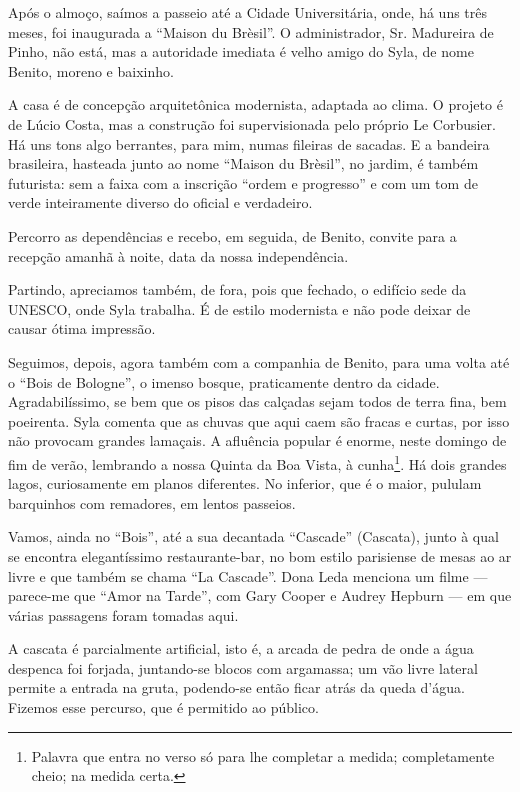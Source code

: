 Após o almoço, saímos a passeio até a Cidade Universitária, onde, há uns três meses, foi inaugurada a ``Maison du Brèsil''. O administrador, Sr. Madureira de Pinho, não está, mas a autoridade imediata é velho amigo do Syla, de nome Benito, moreno e baixinho.

A casa é de concepção arquitetônica modernista, adaptada ao clima. O projeto é de Lúcio Costa, mas a construção foi supervisionada pelo próprio Le Corbusier. Há uns tons algo berrantes, para mim, numas fileiras de sacadas. E a bandeira brasileira, hasteada junto ao nome ``Maison du Brèsil'', no jardim, é também futurista: sem a faixa com a inscrição ``ordem e progresso'' e com um tom de verde inteiramente diverso do oficial e verdadeiro.

Percorro as dependências e recebo, em seguida, de Benito, convite para a recepção amanhã à noite, data da nossa independência.

Partindo, apreciamos também, de fora, pois que fechado, o edifício sede da UNESCO, onde Syla trabalha. É de estilo modernista e não pode deixar de causar ótima impressão.

Seguimos, depois, agora também com a companhia de Benito, para uma volta até o ``Bois de Bologne'', o imenso bosque, praticamente dentro da cidade. Agradabilíssimo, se bem que os pisos das calçadas sejam todos de terra fina, bem poeirenta. Syla comenta que as chuvas que aqui caem são fracas e curtas, por isso não provocam grandes lamaçais. A afluência popular é enorme, neste domingo de fim de verão, lembrando a nossa Quinta da Boa Vista, à cunha\footnote{Palavra que entra no verso só para lhe completar a medida; completamente cheio; na medida certa.}. Há dois grandes lagos, curiosamente em planos diferentes. No inferior, que é o maior, pululam barquinhos com remadores, em lentos passeios.

Vamos, ainda no ``Bois'', até a sua decantada ``Cascade'' (Cascata), junto à qual se encontra elegantíssimo restaurante-bar, no bom estilo parisiense de mesas ao ar livre e que também se chama ``La Cascade''. Dona Leda menciona um filme --- parece-me que ``Amor na Tarde'', com Gary Cooper e Audrey Hepburn --- em que várias passagens foram tomadas aqui.

A cascata é parcialmente artificial, isto é, a arcada de pedra de onde a água despenca foi forjada, juntando-se blocos com argamassa; um vão livre lateral permite a entrada na gruta, podendo-se então ficar atrás da queda d’água. Fizemos esse percurso, que é permitido ao público.

